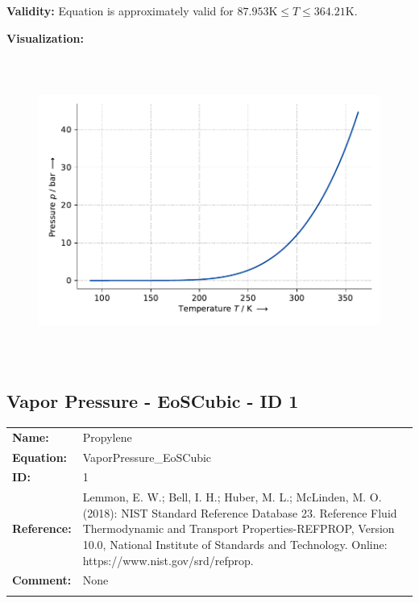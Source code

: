 \textbf{Validity:}
\newline
Equation is approximately valid for $87.953 \si{\kelvin} \leq T \leq 364.21 \si{\kelvin}$.
\newline

\textbf{Visualization:}
%
\begin{figure}[!htp]
{\noindent\includegraphics[height=10cm, keepaspectratio]{figs/ref/ref_Propylene_VaporPressure_EoS1_1.pdf}}
\end{figure}
%

\FloatBarrier
\newpage
\subsection{Vapor Pressure - EoSCubic - ID 1}
%
\begin{tabular}[l]{|lp{11.5cm}|}
\hline
\addlinespace

\textbf{Name:} & Propylene \\
\textbf{Equation:} & VaporPressure\_EoSCubic \\
\textbf{ID:} & 1 \\
\textbf{Reference:} & Lemmon, E. W.; Bell, I. H.; Huber, M. L.; McLinden, M. O. (2018): NIST Standard Reference Database 23. Reference Fluid Thermodynamic and Transport Properties-REFPROP, Version 10.0, National Institute of Standards and Technology. Online: https://www.nist.gov/srd/refprop. \\
\textbf{Comment:} & None \\

\addlinespace
\hline
\end{tabular}
\newline

